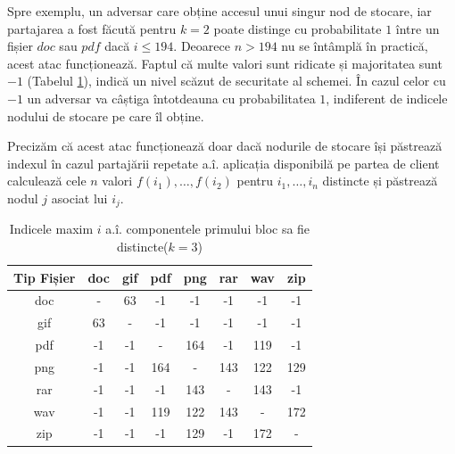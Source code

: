 \documentclass[oneside, 12pt]{book}
\begin{document}
Spre exemplu, un adversar care obține accesul unui singur nod de stocare, iar partajarea a fost făcută pentru $k=2$ poate distinge cu probabilitate $1$ între un fișier $doc$ sau $pdf$ dacă $i \leq 194$. Deoarece $n > 194$ nu se întâmplă în practică, acest atac funcționează. Faptul că multe valori sunt ridicate și majoritatea sunt $-1$ (Tabelul \ref{table:k3}), indică un nivel scăzut de securitate al schemei. În cazul celor cu $-1$ un adversar va câștiga întotdeauna cu probabilitatea $1$, indiferent de indicele nodului de stocare pe care îl obține.

Precizăm că acest atac funcționează doar dacă nodurile de stocare își păstrează indexul în cazul partajării repetate a.î. aplicația disponibilă pe partea de client calculează cele $n$ valori $f(i_1),\dots,f(i_2)$ pentru $i_1,\dots,i_n$ distincte și păstrează nodul $j$ asociat lui $i_j$.


\begin{table}[h]
\begin{center}
\caption{Indicele maxim $i$ a.î. componentele primului bloc sa fie distincte($k=3$)}\label{tb:margins}
\label{table:k3}
\begin{tabular}{cccccccc}
Tip Fișier & doc & gif & pdf & png & rar & wav & zip \\\hline
  doc & - & 63 & -1 & -1 & -1 & -1 & -1\\
  gif & 63 & - & -1 & -1 & -1 & -1 & -1\\
  pdf & -1 & -1 & - & 164 & -1 & 119 & -1\\
  png & -1 & -1 & 164 & - & 143 & 122 & 129\\
  rar & -1 & -1 & -1 & 143 & - & 143 & -1\\
  wav & -1 & -1 & 119 & 122 & 143 & - & 172\\
  zip & -1 & -1 & -1 & 129 & -1 & 172 & -\\ \hline
\end{tabular}
\end{center}
\bigskip
\end{table}
\end{document}

